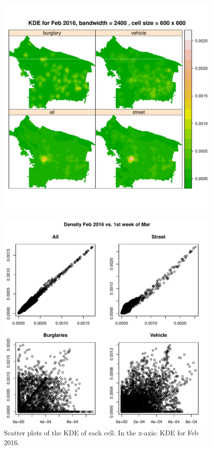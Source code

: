 \documentclass[12pt,letterpaper]{article}
\theoremstyle{plain}
\theoremstyle{plain}
\theoremstyle{definition}
\theoremstyle{remark}
\begin{document}
\begin{figure}[h!]
    \centering
    \includegraphics[]{figures/kde_bycategory.pdf}
    \caption{}
    \label{fig:figure1}
\end{figure}


\begin{figure}[h!]
    \centering
    \includegraphics[]{figures/scatter_kde_1w.pdf}
    \caption{Scatter plots of the KDE of each cell. In the x-axis: KDE for Feb 2016.}
    \label{fig:figure1}
\end{figure}
\end{document}
